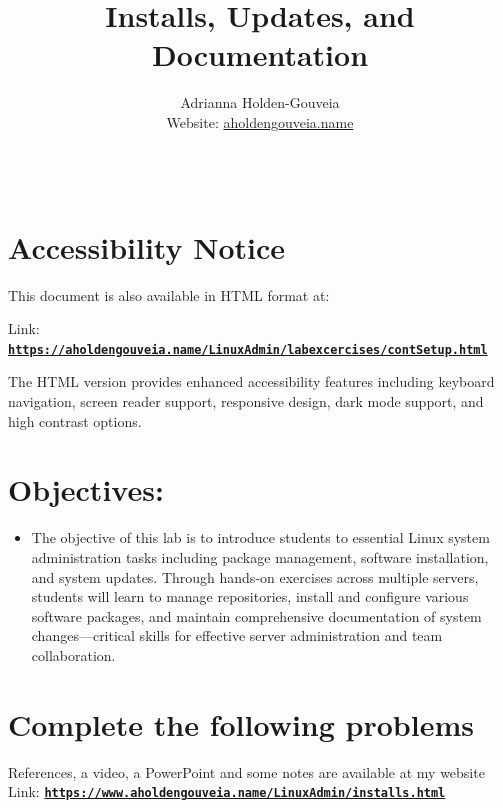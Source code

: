 \documentclass[12pt]{article}
\title{Installs, Updates, and Documentation}
\author{
        Adrianna Holden-Gouveia \\
        Website: \href{https://aholdengouveia.name}{aholdengouveia.name}\\ 
        \date{\vspace{-5ex}}
        \faGithub {: aholdengouveia} \\
        }
\begin{document}
    

\maketitle



\section*{Accessibility Notice}
This document is also available in HTML format at:

Link: \href{https://aholdengouveia.name/LinuxAdmin/labexcercises/contSetup.html}{\textbf{\nolinkurl{https://aholdengouveia.name/LinuxAdmin/labexcercises/contSetup.html}}}

The HTML version provides enhanced accessibility features including keyboard navigation, screen reader support, responsive design, dark mode support, and high contrast options.

\section*{Objectives:}
\begin{itemize}
    \item The objective of this lab is to introduce students to essential Linux system administration tasks including package management, software installation, and system updates. Through hands-on exercises across multiple servers, students will learn to manage repositories, install and configure various software packages, and maintain comprehensive documentation of system changes—critical skills for effective server administration and team collaboration.
\end{itemize}
\section*{Complete the following problems}

References, a video, a PowerPoint and some notes are available at my website
Link: \href{https://www.aholdengouveia.name/LinuxAdmin/installs.html}{\textbf{\nolinkurl{https://www.aholdengouveia.name/LinuxAdmin/installs.html}}}
\end{document}
